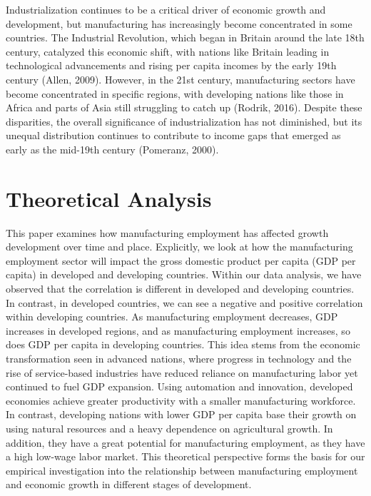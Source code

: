 \documentclass[12pt]{article}
\begin{document}
Industrialization continues to be a critical driver of economic growth and development, but manufacturing has increasingly become concentrated in some countries. The Industrial Revolution, which began in Britain around the late 18th century, catalyzed this economic shift, with nations like Britain leading in technological advancements and rising per capita incomes by the early 19th century (Allen, 2009). However, in the 21st century, manufacturing sectors have become concentrated in specific regions, with developing nations like those in Africa and parts of Asia still struggling to catch up (Rodrik, 2016). Despite these disparities, the overall significance of industrialization has not diminished, but its unequal distribution continues to contribute to income gaps that emerged as early as the mid-19th century (Pomeranz, 2000).

\section{Theoretical Analysis}
\label{sec:theory}
This paper examines how manufacturing employment has affected growth development over time and place. Explicitly, we look at how the manufacturing employment sector will impact the gross domestic product per capita (GDP per capita) in developed and developing countries. Within our data analysis, we have observed that the correlation is different in developed and developing countries. In contrast, in developed countries, we can see a negative and positive correlation within developing countries. As manufacturing employment decreases, GDP increases in developed regions, and as manufacturing employment increases, so does GDP per capita in developing countries. This idea stems from the economic transformation seen in advanced nations, where progress in technology and the rise of service-based industries have reduced reliance on manufacturing labor yet continued to fuel GDP expansion. Using automation and innovation, developed economies achieve greater productivity with a smaller manufacturing workforce. In contrast, developing nations with lower GDP per capita base their growth on using natural resources and a heavy dependence on agricultural growth. In addition, they have a great potential for manufacturing employment, as they have a high low-wage labor market. This theoretical perspective forms the basis for our empirical investigation into the relationship between manufacturing employment and economic growth in different stages of development.
\end{document}
